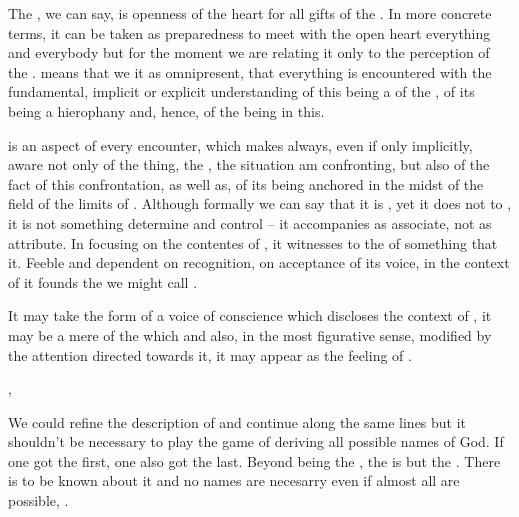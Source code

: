 \pa\label{adopenness} The , we can say, is openness of
the heart for all gifts of the .  In more concrete terms,
it can be taken as preparedness to meet with the open heart everything
and everybody but for the moment we are relating it only to the
perception of the .   means that we
 it as omnipresent, that everything is encountered with
the fundamental, implicit or explicit understanding of this being a
 of the , of its being a hierophany and, hence, of
the  being  in this.

\subpa\label{selfomniscient}
 is an aspect of every  encounter,
which makes  always, even if only implicitly, aware not only of
the thing, the , the situation  am confronting, but
also of the fact of this confrontation, as well as, of its being
anchored in the midst of the field of 
 the limits of .  Although formally we
can say that it is  , yet it does not
 to , it is not something  determine and
control -- it accompanies  as  associate, not as 
 attribute.  
In  focusing on the  contentes of
, it witnesses to the  of something that
 it. Feeble and dependent on  recognition, on 
acceptance of its voice, in the context of  it founds the 
 we might call . 

It may take 
the form of a voice of conscience which discloses the  
context of , it may be a mere  of the
 which   and also, in the 
most figurative sense, modified by the  attention directed 
towards it, it may appear as the feeling of . 

\sep


\pa We could refine the description of  and continue along
the same lines but it shouldn't be necessary to play the game of
deriving all possible names of God.  If one got the first, one also
got the last.  Beyond being the , the  is but the
.  There is  to be known about it and no names
are necesarry even if almost all are possible,   
.

